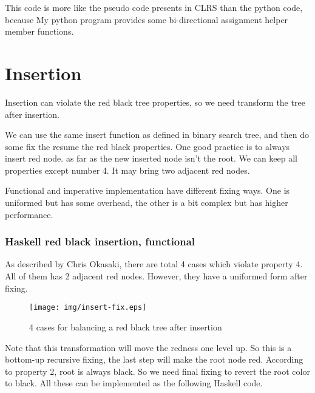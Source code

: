 \documentclass{article}
\begin{document}
This code is more like the pseudo code presents in CLRS than the
python code, because My python program provides some bi-directional
assignment helper member functions.

\section{Insertion}

Insertion can violate the red black tree properties, so we need transform
the tree after insertion.

We can use the same insert function as defined in binary search tree, and 
then do some fix the resume the red black properties. One good practice is 
to always insert red node. as far as the new inserted node isn't the root.
We can keep all properties except number 4. It may bring two adjacent red
nodes.

Functional and imperative implementation have different fixing ways. One
is uniformed but has some overhead, the other is a bit complex but has 
higher performance.

\subsubsection*{Haskell red black insertion, functional}
As described by Chris Okasaki, there are total 4 cases which violate property 4.
All of them has 2 adjacent red nodes. However, they have a uniformed form
after fixing\cite{okasaki}. 

\begin{figure}[htbp]
       \begin{center}
	\texttt{[image: img/insert-fix.eps]}
        \caption{4 cases for balancing a red black tree after insertion} \label{fig:insert-fix}
       \end{center}
\end{figure}

Note that this transformation will move the redness one level up. So this is a bottom-up recursive fixing, the last step will make the root node red. According
to property 2, root is always black. So we need final fixing to revert the root
color to black. All these can be implemented as the following Haskell code.
\end{document}
